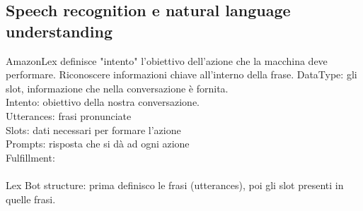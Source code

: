 \documentclass[10pt]{article}
\begin{document}
\subsection{Speech recognition e natural language understanding}
AmazonLex definisce "intento" l'obiettivo dell'azione che la macchina deve performare. Riconoscere informazioni chiave all'interno della frase. DataType: gli slot, informazione che nella conversazione è fornita.\\
Intento: obiettivo della nostra conversazione.\\
Utterances: frasi pronunciate\\
Slots: dati necessari per formare l'azione\\
Prompts: risposta che si dà ad ogni azione\\
Fulfillment: \\\\
Lex Bot structure: prima definisco le frasi (utterances), poi gli slot presenti in quelle frasi.
\end{document}
